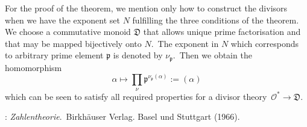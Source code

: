 \documentclass[12pt]{article}
\theoremstyle{definition}
\begin{document}
For the proof of the theorem, we mention only how to construct the divisors when we have the exponent set $N$ fulfilling the three conditions of the theorem.\, We choose a commutative monoid $\mathfrak{D}$ that allows unique prime factorisation and that may be mapped bijectively onto $N$.\, The exponent in $N$ which corresponds to arbitrary prime element $\mathfrak{p}$ is denoted by $\nu_\mathfrak{p}$.\, Then we obtain the homomorphism
$$\alpha \mapsto \prod_\nu \mathfrak{p}^{\nu_\mathfrak{p}(\alpha)} := (\alpha)$$
which can be seen to satisfy all required properties for a divisor theory\, $\mathcal{O}^* \to \mathfrak{D}$.

\begin{thebibliography}{9}
: {\em Zahlentheorie}.\, Birkh\"auser Verlag. Basel und Stuttgart (1966).
\end{thebibliography}
\end{document}
